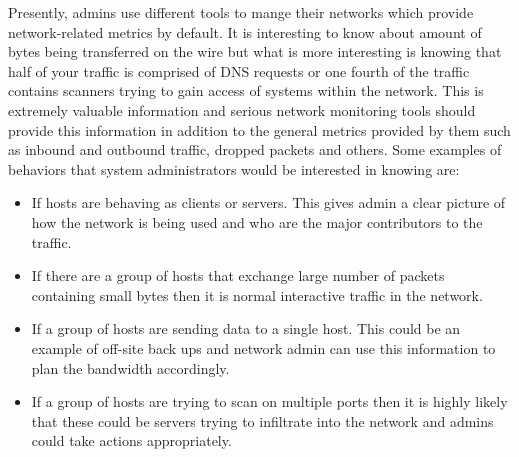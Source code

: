 Presently, admins use different tools to mange their networks which provide network-related metrics by default. It is interesting to know about amount of bytes being transferred on the wire but what is more interesting is knowing that half of your traffic is comprised of DNS requests or one fourth of the traffic contains scanners trying to gain access of systems within the network. This is extremely valuable information and serious network monitoring tools should provide this information in addition to the general metrics provided by them such as inbound and outbound traffic, dropped packets and others. Some examples of behaviors that system administrators would be interested in knowing are:
\begin{itemize}
	\item If hosts are behaving as clients or servers. This gives admin a clear picture of how the network is being used and who are the major contributors to the traffic.
	\item If there are a group of hosts that exchange large number of packets containing small bytes then it is normal interactive traffic in the network.	
	\item If a group of hosts are sending data to a single host. This could be an example of off-site back ups and network admin can use this information to plan the bandwidth accordingly.
	\item If a group of hosts are trying to scan on multiple ports then it is highly likely that these could be servers trying to infiltrate into the network and admins could take actions appropriately.
	
\end{itemize}

